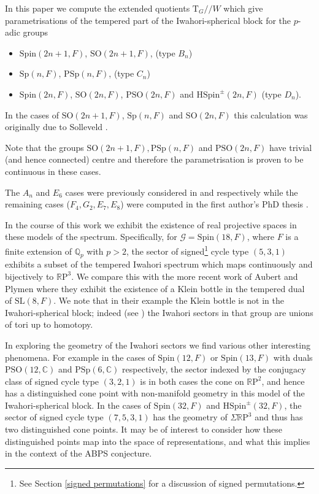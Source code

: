 \documentclass[11pt,a4paper]{article}
\def\HSpin{\mathrm{HSpin}}
\def\Spin{\mathrm{Spin}}
\def\SO{\mathrm{SO}}
\def\PSO{\mathrm{PSO}}
\def\Sp{\mathrm{Sp}}
\def\PSp{\mathrm{PSp}}
\def\SL{\mathrm{SL}}
\def\R{\mathbb{R}}
\def\Q{\mathbb{Q}}
\def\RP{\R\mathrm{P}}
\newcommand{\C}{\mathbb{C}}
\def\q {{/\!/}}
\def\bT{\mathrm{T}}
\def\G{\mathcal{G}}
\begin{document}
In this paper we compute the extended quotients $\bT_G\q W$ which give parametrisations of the tempered part of the Iwahori-spherical block for the $p$-adic groups
\begin{itemize}
    \item $\Spin(2n+1,F)$, $\SO(2n+1,F)$, (type $B_n$)
    \item $\Sp(n,F)$, $\PSp(n,F)$, (type $C_n$)
    \item $\Spin(2n,F)$, $\SO(2n,F)$, $\PSO(2n,F)$ and $\HSpin^\pm(2n,F)$ (type $D_n$).
\end{itemize}
In the cases of $\SO(2n+1,F)$, $\Sp(n,F)$ and $\SO(2n,F)$ this calculation was originally due to Solleveld \cite{Sol}.



Note that the groups $\SO(2n+1,F), \PSp(n,F)$ and $\PSO(2n,F)$ have trivial (and hence connected) centre and therefore the parametrisation is proven to be continuous in these cases.

The $A_n$ and $E_6$ cases were previously considered in \cite{NPWAn} and \cite{NPWE6} respectively while the remaining cases ($F_4, G_2, E_7, E_8$) were computed in the first author's PhD thesis \cite{Majda}.

In the course of this work we exhibit the existence of real projective spaces in these models of the spectrum. 
Specifically, for $\G=\Spin(18,F)$, where $F$ is a finite extension of $\Q_p$ with $p>2$, the sector of signed\footnote{See Section \ref{signed permutations} for a  discussion of signed permutations.} cycle type $(5,3,1)$ exhibits a subset of the tempered Iwahori spectrum which maps continuously and bijectively to $\R \mathrm{P}^3$. We compare this with the more recent work of Aubert and Plymen \cite{AP} where they exhibit the existence of a Klein bottle in the tempered dual of $\SL(8,F)$. We note that in their example the Klein bottle is not in the Iwahori-spherical block; indeed (see \cite{NPWAn}) the Iwahori sectors in that group are unions of tori up to homotopy.

In exploring the geometry of the Iwahori sectors we find various other interesting phenomena.  For example in the cases of $\Spin(12,F)$ or $\Spin(13,F)$ with duals $\PSO(12,\C)$ and $\PSp(6,\C)$ respectively, the sector indexed by the conjugacy class of signed cycle type $(3,2,1)$ is in both cases the cone on $\RP^2$, and hence has a distinguished cone point with non-manifold geometry in this model of the Iwahori-spherical block. In the cases of $\Spin(32,F)$ and $\HSpin^\pm(32,F)$, the sector of signed cycle type $(7,5,3,1)$ has the geometry of $\Sigma\RP^3$ and thus has two distinguished cone points. It may be of interest to consider how these distinguished points map into the space of representations, and what this implies in the context of the ABPS conjecture.
\bigskip
\end{document}
